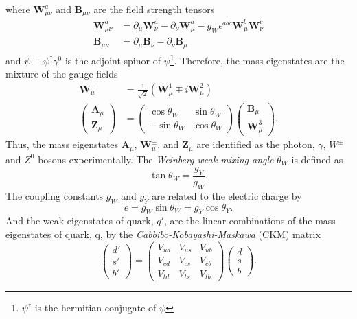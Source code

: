 %
where $\bm{W}_{\mu\nu}^{a}$ and $\bm{B}_{\mu\nu}$ are the field strength tensors
%
\begin{align}
\bm{W}_{\mu\nu}^{a} & = \partial_{\mu} \bm{W}_{\nu}^{a} - \partial_{\nu} \bm{W}_{\mu}^{a} - g_{W} \epsilon^{abc} \bm{W}_{\mu}^{b} \bm{W}_{\nu}^{c}\\
\bm{B}_{\mu\nu} & = \partial_{\mu} \bm{B}_{\nu} - \partial_{\nu} \bm{B}_{\mu}
\label{eq:sm_field_strangth_tensors}
\end{align}
%
and $\bar{\psi} \equiv \psi^{\dagger} \gamma^{0}$ is the adjoint spinor of $\psi$\footnote{$\psi^{\dagger}$ is the hermitian conjugate of $\psi$}.
Therefore, the mass eigenstates are the mixture of the gauge fields
%
\begin{align}
\bm{W}_{\mu}^{\pm} & = \frac{1}{\sqrt{2}} (\bm{W}_{\mu}^{1} \mp i \bm{W}_{\mu}^{2})\\
\left(\begin{matrix}\bm{A}_{\mu}\\\bm{Z}_{\mu}\end{matrix}\right) & = \left(\begin{matrix}\cos\theta_{W} & \sin\theta_{W}\\-\sin\theta_{W} & \cos\theta_{W} \end{matrix}\right) \left(\begin{matrix}\bm{B}_{\mu}\\\bm{W}_{\mu}^{3}\end{matrix}\right).
\label{eq:sm_mass_eigenstates}
\end{align}
%
Thus, the mass eigenstates $\bm{A}_{\mu}$, $\bm{W}_{\mu}^{\pm}$, and $\bm{Z}_{\mu}$ are identified as the photon, $\gamma$, $W^{\pm}$ and $Z^{0}$ bosons experimentally.
The \textit{Weinberg weak mixing angle} $\theta_{W}$ is defined as
%
\begin{equation}
\tan \theta_{W} = \frac{g_{Y}}{g_{W}}.
\label{eq:sm_mixing_angle}
\end{equation}
%
The coupling constants $g_{W}$ and $g_{Y}$ are related to the electric charge by
%
\begin{equation}
e = g_{W} \sin\theta_{W} = g_{Y} \cos\theta_{Y}.
\label{eq:sm_coupling_constants}
\end{equation}
%
And the weak eigenstates of quark, $q'$, are the linear combinations of the mass eigenstates of quark, q, by the \textit{Cabbibo-Kobayashi-Maskawa} (CKM) matrix~\cite{PTP.49.652}
%
\begin{equation}
\left(\begin{matrix}d'\\s'\\b'\end{matrix}\right) = \left(\begin{matrix}V_{ud} & V_{us} & V_{ub}\\V_{cd} & V_{cs} & V_{cb}\\V_{td} & V_{ts} &V_{tb}\end{matrix}\right) \left(\begin{matrix}d\\s\\b\end{matrix}\right).
\label{eq:sm_CKM_matrix}
\end{equation}
